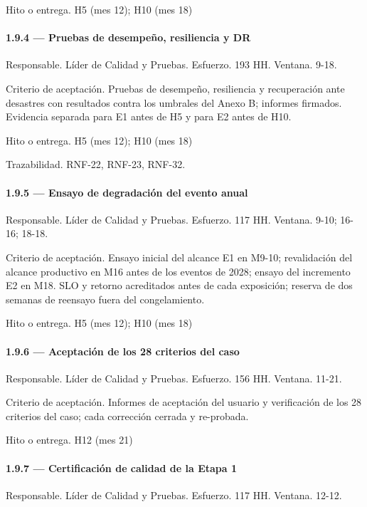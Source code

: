 \documentclass[11pt]{article}
\begin{document}
Hito o entrega. H5 (mes 12); H10 (mes 18)

\paragraph{1.9.4 — Pruebas de desempeño, resiliencia y DR}

Responsable. Líder de Calidad y Pruebas. Esfuerzo. 193 HH. Ventana. 9-18.

Criterio de aceptación. Pruebas de desempeño, resiliencia y recuperación ante desastres con resultados contra los umbrales del Anexo B; informes firmados. Evidencia separada para E1 antes de H5 y para E2 antes de H10.

Hito o entrega. H5 (mes 12); H10 (mes 18)

Trazabilidad. RNF-22, RNF-23, RNF-32.

\paragraph{1.9.5 — Ensayo de degradación del evento anual}

Responsable. Líder de Calidad y Pruebas. Esfuerzo. 117 HH. Ventana. 9-10; 16-16; 18-18.

Criterio de aceptación. Ensayo inicial del alcance E1 en M9-10; revalidación del alcance productivo en M16 antes de los eventos de 2028; ensayo del incremento E2 en M18. SLO y retorno acreditados antes de cada exposición; reserva de dos semanas de reensayo fuera del congelamiento.

Hito o entrega. H5 (mes 12); H10 (mes 18)

\paragraph{1.9.6 — Aceptación de los 28 criterios del caso}

Responsable. Líder de Calidad y Pruebas. Esfuerzo. 156 HH. Ventana. 11-21.

Criterio de aceptación. Informes de aceptación del usuario y verificación de los 28 criterios del caso; cada corrección cerrada y re-probada.

Hito o entrega. H12 (mes 21)

\paragraph{1.9.7 — Certificación de calidad de la Etapa 1}

Responsable. Líder de Calidad y Pruebas. Esfuerzo. 117 HH. Ventana. 12-12.
\end{document}
